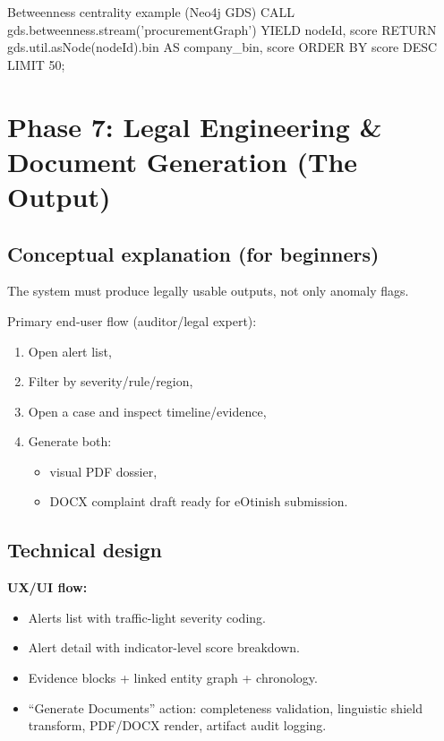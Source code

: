 \documentclass[11pt,a4paper]{article}
\begin{document}
\begin{codeblock}[language={}]{Betweenness centrality example (Neo4j GDS)}
CALL gds.betweenness.stream('procurementGraph')
YIELD nodeId, score
RETURN gds.util.asNode(nodeId).bin AS company_bin, score
ORDER BY score DESC
LIMIT 50;
\end{codeblock}

\section{Phase 7: Legal Engineering \& Document Generation (The Output)}

\subsection{Conceptual explanation (for beginners)}
\begin{conceptbox}
The system must produce legally usable outputs, not only anomaly flags.

Primary end-user flow (auditor/legal expert):
\begin{enumerate}[leftmargin=1.5em]
  \item Open alert list,
  \item Filter by severity/rule/region,
  \item Open a case and inspect timeline/evidence,
  \item Generate both:
    \begin{itemize}[leftmargin=1.4em]
      \item visual PDF dossier,
      \item DOCX complaint draft ready for eOtinish submission.
    \end{itemize}
\end{enumerate}
\end{conceptbox}

\subsection{Technical design}
\textbf{UX/UI flow:}
\begin{itemize}[leftmargin=1.4em]
  \item Alerts list with traffic-light severity coding.
  \item Alert detail with indicator-level score breakdown.
  \item Evidence blocks + linked entity graph + chronology.
  \item ``Generate Documents'' action:
    completeness validation,
    linguistic shield transform,
    PDF/DOCX render,
    artifact audit logging.
\end{itemize}
\end{document}
